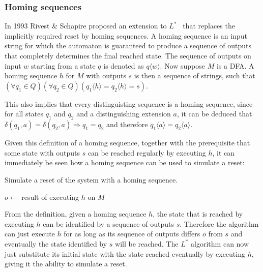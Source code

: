 \subsubsection{Homing sequences}
In 1993 Rivest \& Schapire proposed an extension to $L^*$~\cite[p. 312]{Rivest1993}
that replaces the implicitly required reset by homing sequences.
A homing sequence is an input string for which the automaton is guaranteed to
produce a sequence of outputs that completely determines the final reached state.
The sequence of outputs on input $w$ starting from a state $q$ is denoted as
$q \langle w \rangle$.
Now suppose $M$ is a DFA. A homing sequence $h$ for $M$ with outputs $s$ is then
a sequence of strings, such that $(\forall{q_1 \in Q})(\forall{q_2 \in Q})
(q_1 \langle h \rangle = q_2 \langle h \rangle = s)$.

This also implies that every distinguisting sequence is a homing sequence,
since for all states $q_1$ and $q_2$ and a distinguishing extension $a$,
it can be deduced that $\delta(q_1, a) = \delta(q_2, a) \Rightarrow q_1 = q_2$
and therefore $q_1 \langle a \rangle = q_2 \langle a \rangle$.

Given this definition of a homing sequence, together with the prerequisite
that some state with outputs $s$ can be reached regularly by executing $h$,
it can immediately be seen how a homing sequence can be used to simulate a reset:
\begin{algorithm}[hb]
  \caption{Simulate a reset of the system with a homing sequence.}
  \label{alg:reset-homing}
  \begin{algorithmic}[1]
     
      \Do
        \State $o \gets $ result of executing $h$ on $M$
    \EndFunction{}
  \end{algorithmic}
\end{algorithm}

From the definition, given a homing sequence $h$, the state that is reached
by executing $h$ can be identified by a sequence of outputs $s$.
Therefore the algorithm can just execute $h$ for as long as its sequence of
outputs differs $o$ from $s$ and eventually the state identified by $s$ will be reached.
The $L^*$ algorithm can now just substitute its initial state with the state
reached eventually by executing $h$, giving it the ability to simulate a reset.

